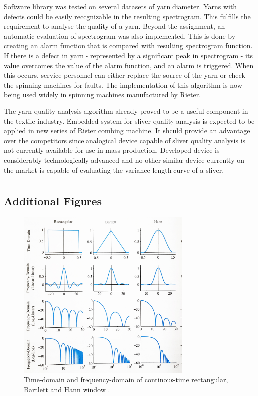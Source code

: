 \documentclass[twoside]{ctuthesis}
\theoremstyle{plain}
\theoremstyle{definition}
\theoremstyle{note}
\begin{document}
Software library was tested on several datasets of yarn diameter. Yarns with defects could be easily recognizable in the resulting spectrogram. This fulfills the requirement to analyse the quality of a yarn. Beyond the assignment, an automatic evaluation of spectrogram was also implemented. This is done by creating an alarm function that is compared with resulting spectrogram function. If there is a defect in yarn - represented by a significant peak in spectrogram - its value overcomes the value of the alarm function, and an alarm is triggered. When this occurs, service personnel can either replace the source of the yarn or check the spinning machines for faults. The implementation of this algorithm is now being used widely in spinning machines manufactured by Rieter.

The yarn quality analysis algorithm already proved to be a useful component in the textile industry. Embedded system for sliver quality analysis is expected to be applied in new series of Rieter combing machine. It should provide an advantage over the competitors since analogical device capable of sliver quality analysis is not currently available for use in mass production. Developed device is considerably technologically advanced and no other similar device currently on the market is capable of evaluating the variance-length curve of a sliver.


\appendix

\printindex

\appendix




%



\chapter{}
\section{Additional Figures}
\begin{figure}[h]
	\centering
	\includegraphics[width=0.75\textwidth]{windows.jpg}
	\caption{Time-domain and frequency-domain of continous-time rectangular, Bartlett and Hann window \cite{cite:3}.}
	\label{fig:windowComparison}
\end{figure}

\end{document}
